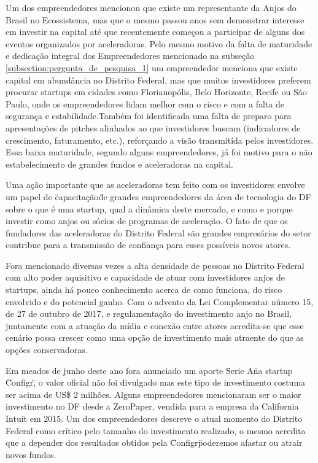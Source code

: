 Um dos empreendedores mencionou que existe um representante da Anjos do Brasil no Ecossistema, mas que o mesmo passou anos sem demonstrar interesse em investir na capital até que recentemente começou a participar de alguns dos eventos organizados por aceleradoras. Pelo mesmo motivo da falta de maturidade e dedicação integral dos Empreendedores mencionado na subseção \ref{subsection:pergunta_de_pesquisa_1} um empreendedor menciona que existe capital em abundância no Distrito Federal, mas que muitos investidores preferem procurar startups em cidades como Florianopólis, Belo Horizonte, Recife ou São Paulo, onde os empreendedores lidam melhor com o risco e com a falta de segurança e estabilidade.Também foi identificada uma falta de preparo para apresentações de pitches alinhados ao que investidores buscam (indicadores de crescimento, faturamento, etc.), reforçando a visão transmitida pelos investidores. Essa baixa maturidade, segundo alguns empreendedores, já foi motivo para o não estabelecimento de grandes fundos e aceleradoras na capital.

Uma ação importante que as aceleradoras tem feito com os investidores envolve um papel de \"capacitação\" de grandes empreendedores da área de tecnologia do DF sobre o que é uma startup, qual a dinâmica deste mercado, e como e porque investir como anjos ou sócios de programas de aceleração. O fato de que os fundadores das aceleradoras do Distrito Federal são grandes empresários do setor contribue para a transmissão de confiança para esses possíveis novos atores. 

Fora mencionado diversas vezes a alta densidade de pessoas no Distrito Federal com alto poder aquisitivo e capacidade de atuar com investidores anjos de startups, ainda há pouco conhecimento acerca de como funciona, do risco envolvido e do potencial ganho. Com o advento da Lei Complementar número 15, de 27 de outubro de 2017, e regulamentação do investimento anjo no Brasil, juntamente com a atuação da mídia e conexão entre atores acredita-se que esse cenário possa crescer como uma opção de investimento mais atraente do que as opções conservadoras.

Em meados de junho deste ano fora anunciado um aporte \"Serie A\" na startup \"Configr\", o valor oficial não foi divulgado mas este tipo de investimento costuma ser acima de US\$ 2 milhões. Alguns empreendedores mencionaram ser o maior investimento no DF desde a ZeroPaper, vendida para a empresa da California Intuit em 2015. Um dos empreendedores descreve o atual momento do Distrito Federal como crítico pelo tamanho do investimento realizado, o mesmo acredita que a depender dos resultados obtidos pela \"Configr\" poderemos afastar ou atrair novos fundos.


